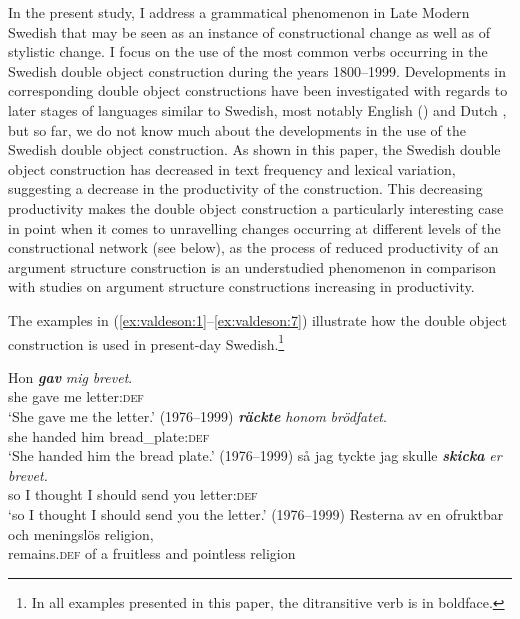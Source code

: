 \documentclass[output=paper]{langscibook}
\begin{document}
In the present study, I address a grammatical phenomenon in Late Modern Swedish that may be seen as an instance of constructional change as well as of stylistic change. I focus on the use of the most common verbs occurring in the Swedish double object construction during the years 1800–1999. Developments in corresponding double object constructions have been investigated with regards to later stages of languages similar to Swedish, most notably English (\citealt{CollemanDe_Clerck2008,  CollemanDe_Clerck2011, CollemanDe_Clerck2008}) and Dutch \citep{Colleman2011}, but so far, we do not know much about the developments in the use of the Swedish double object construction. As shown in this paper, the Swedish double object construction has decreased in text frequency and lexical variation, suggesting a decrease in the productivity of the construction. This decreasing productivity makes the double object construction a particularly interesting case in point when it comes to unravelling changes occurring at different levels of the constructional network (see  below), as the process of reduced productivity of an argument structure construction is an understudied phenomenon in comparison with studies on argument structure constructions increasing in productivity.



The examples in (\ref{ex:valdeson:1}--\ref{ex:valdeson:7}) illustrate how the double object construction is used in present-day Swedish.\footnote{In all examples presented in this paper, the ditransitive verb is in boldface.}


\ea \label{ex:valdeson:1}
\gll Hon \textbf{\textit{gav}} \textit{mig}     \textit{brevet}.\\
she    gave     me   letter:\textsc{def}\\
\glt `She gave me the letter.’ (1976--1999)
\ex
{} \textbf{\textit{räckte}} \textit{honom}     \textit{brödfatet}.\\
  she       handed     him       bread\_plate:\textsc{def}  \\
\glt `She handed him the bread plate.’ (1976--1999)
\ex
\gll så     jag   tyckte   jag     skulle \textbf{\textit{skicka}} \textit{er}       \textit{brevet.}\\
  so    I        thought  I      should    send    you    letter:\textsc{def}\\
\glt `so I thought I should send you the letter.’ (1976--1999)
\ex
\gll Resterna av   en ofruktbar     och   meningslös religion,\\
  remains.\textsc{def} of  a  fruitless  and  pointless  religion    \\
\end{document}

